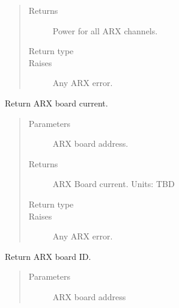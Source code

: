 \documentclass[letterpaper,10pt,english]{sphinxmanual}
\begin{document}
\begin{fulllineitems}
\begin{fulllineitems}
\begin{quote}
\begin{description}
\item[{Returns}] \leavevmode
Power for all ARX channels.

\item[{Return type}] \leavevmode
{}

\item[{Raises}] \leavevmode
{} \textendash{} Any ARX error.

\end{description}\end{quote}

\end{fulllineitems}


\begin{fulllineitems}
\label{\detokenize{index:lwautils.lwa_arx.ARX.get_board_current}}
Return ARX board current.
\begin{quote}\begin{description}
\item[{Parameters}] \leavevmode
{} \textendash{} ARX board address.

\item[{Returns}] \leavevmode
ARX Board current. Units: TBD

\item[{Return type}] \leavevmode
{}

\item[{Raises}] \leavevmode
{} \textendash{} Any ARX error.

\end{description}\end{quote}

\end{fulllineitems}


\begin{fulllineitems}
\label{\detokenize{index:lwautils.lwa_arx.ARX.get_board_id}}
Return ARX board ID.
\begin{quote}\begin{description}
\item[{Parameters}] \leavevmode
{} \textendash{} ARX board address


\end{description}
\end{quote}
\end{fulllineitems}
\end{fulllineitems}
\end{document}
